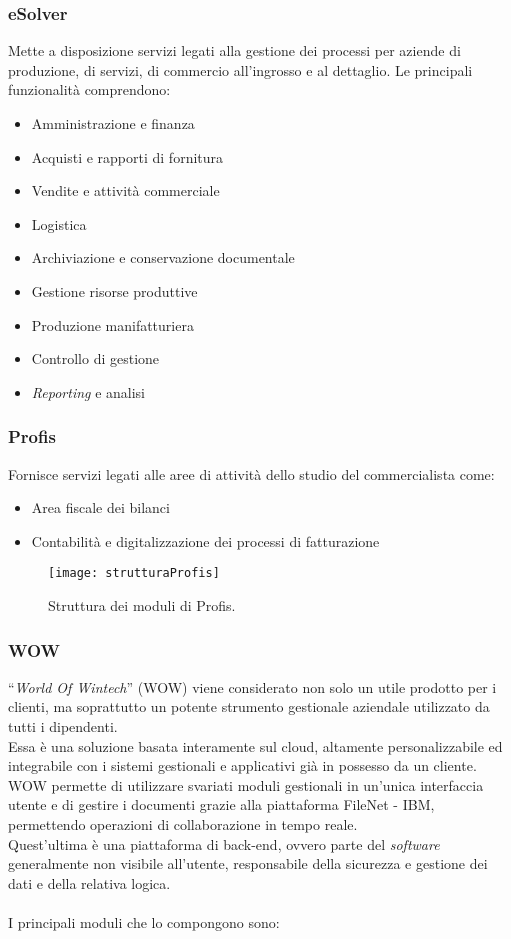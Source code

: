 \subsubsection*{eSolver}
Mette a disposizione servizi legati alla gestione dei processi per aziende di produzione, di servizi, di commercio all'ingrosso e al dettaglio. 
Le principali funzionalità comprendono: 
\begin{itemize}
    \item Amministrazione e finanza 
    \item Acquisti e rapporti di fornitura 
    \item Vendite e attività commerciale 
    \item Logistica
    \item Archiviazione e conservazione documentale
    \item Gestione risorse produttive 
    \item Produzione manifatturiera  
    \item Controllo di gestione 
    \item \emph{Reporting} e analisi 
\end{itemize}

\subsubsection*{Profis}
Fornisce servizi legati alle aree di attività dello studio del commercialista come: 
\begin{itemize}
    \item Area fiscale dei bilanci 
    \item Contabilità e digitalizzazione dei processi di fatturazione  
\end{itemize}
\begin{figure}[htbp] 
    \centering 
    \texttt{[image: strutturaProfis]}
    \caption{Struttura dei moduli di Profis.}
    \label{fig:strutturaProfis}
\end{figure}


\subsubsection*{WOW}
\label{WOW}
“\emph{World Of Wintech}” (WOW) viene considerato non solo un utile prodotto per i clienti, ma soprattutto un potente strumento gestionale aziendale utilizzato da tutti i dipendenti.\\ 
Essa è una soluzione basata interamente sul \gls{cloud}, altamente personalizzabile ed integrabile con i sistemi gestionali e applicativi già in possesso da un cliente.\\
WOW permette di utilizzare svariati moduli gestionali in un'unica interfaccia utente e di gestire i documenti grazie alla piattaforma FileNet - IBM, permettendo operazioni di collaborazione in tempo reale.\\
Quest'ultima è una piattaforma di \gls{back-end}, ovvero parte del \emph{software} generalmente non visibile all'utente, responsabile della sicurezza e gestione dei dati e della relativa logica.\\\\
I principali moduli che lo compongono sono: 

